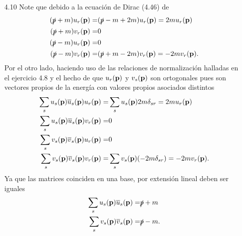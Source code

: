 \documentclass{article}
\begin{document}
\begin{enumerate}
\item[4.10] Note que debido a la ecuación de Dirac (4.46) de \cite{Lahiri2005}
\begin{align}
\begin{split}
(\slashed{p}+m)u_r(\vb{p})=&(\slashed{p}-m+2m)u_r(\vb{p})=2mu_r(\vb{p})\\
(\slashed{p}+m)v_r(\vb{p})=&0\\
(\slashed{p}-m)u_r(\vb{p})=&0\\
(\slashed{p}-m)v_r(\vb{p})=&(\slashed{p}+m-2m)v_r(\vb{p})=-2mv_r(\vb{p}).
\end{split}
\end{align}
Por el otro lado, haciendo uso de las relaciones de normalización halladas en el ejercicio 4.8 y el hecho de que $u_r(\vb{p})$ y $v_s(\vb{p})$ son ortogonales pues son vectores propios de la energía con valores propios asociados distintos
\begin{align}
\begin{split}
\sum_s u_s(\vb{p})\overline{u}_s(\vb{p})u_r(\vb{p})=&\sum_s u_s(\vb{p})2m\delta_{sr}=2mu_r(\vb{p})\\
\sum_s u_s(\vb{p})\overline{u}_s(\vb{p})v_r(\vb{p})=&0\\
\sum_s v_s(\vb{p})\overline{v}_s(\vb{p})u_r(\vb{p})=&0\\
\sum_s v_s(\vb{p})\overline{v}_s(\vb{p})v_r(\vb{p})=&\sum_s v_s(\vb{p})(-2m\delta_{sr})=-2mv_r(\vb{p}).
\end{split}
\end{align}
Ya que las matrices coinciden en una base, por extensión lineal deben ser iguales
\begin{align}
\begin{split}
\sum_s u_s(\vb{p})\overline{u}_s(\vb{p})=&\slashed{p}+m\\
\sum_s v_s(\vb{p})\overline{v}_s(\vb{p})=&\slashed{p}-m.
\end{split}
\end{align}

\end{enumerate}



\end{document}
